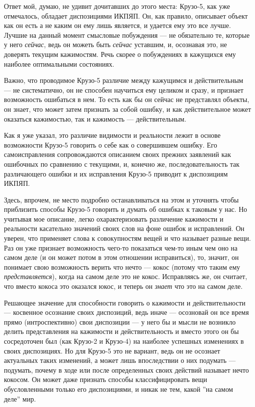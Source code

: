 \documentclass[11pt]{book}
\begin{document}
Ответ мой, думаю, не удивит дочитавших до этого места: Крузо-5, как уже отмечалось, обладает диспозициями ИКПЯП. Он, как правило, описывает объект как он есть а не каким он ему лишь является, и удается ему это все лучше. Лучшие на данный момент смысловые побуждения --- не обязательно те, которые у него \textit{сейчас}, ведь он можеть быть \textit{сейчас} уставшим, и, осознавая это, не доверять текущим кажимостям. Речь скорее о побуждениях в кажущихся ему наиболее оптимальными состояниях.

Важно, что проводимое Крузо-5 различие между кажущимся и действительным --- не систематично, он не способен научиться ему целиком и сразу, и признает возможность ошибаться в нем. То есть как бы он сейчас не представлял объекты, он знает, что может затем признать за собой ошибку, и как действительное может оказаться кажимостью, так и кажимость --- действительным.

Как я уже указал, это различие видимости и реальности лежит в основе возможности Крузо-5 говорить о себе как о совершившем ошибку. Его самоисправления сопровождаются описанием своих прежних заявлений как ошибочных по сравнению с текущими, и, конечно же, последовательность так различающего ошибки и их исправления Крузо-5 приводит к диспозициям ИКПЯП.

Здесь, впрочем, не место подробно останавливаться на этом и уточнять чтобы приблизить способы Крузо-5 говорить и думать об ошибках к таковым у нас. Но учитывая мое описание, легко охарактеризовать различение кажимости и реальности касательно значений своих слов на фоне ошибок и исправлений. Он уверен, что применяет слова к совокупностям вещей и что называет разные вещи. Раз он уже признает возможность чего-то показаться чем-то иным чем оно на самом деле (и он может потом в этом отношении исправиться), то, значит, он понимает свою возможность верить что нечто --- кокос (потому что таким ему \textit{представляется}), когда на самом деле это не кокос. Исправляясь же, он считает, что вместо кокоса это оказался юкос, и теперь он \textit{знает} что это на самом деле.

Решающее значение для способности говорить о кажимости и действительности --- косвенное осознание своих диспозиций, ведь иначе --- осозновай он все время прямо (интроспективно) свои диспозиции --- у него бы и мысли не возникло делить представления на кажимости и действительность и вместо этого он бы сосредоточен был (как Крузо-2 и Крузо-4) на наиболее успешных изменениях в своих диспозициях. Но для Крузо-5 это не вариант, ведь он не осознает актуальных таких изменений, а может лишь впоследствии о них подумать --- подумать, почему в ходе или после определенных своих действий называет нечто кокосом. Он может даже признать способы классифицировать вещи обусловленными только его диспозициями, и никак не тем, какой ''на самом деле'' мир.
\end{document}
